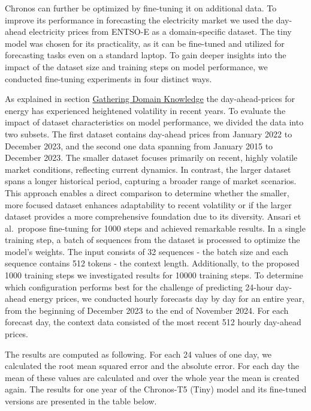\documentclass[a4paper]{article}
\begin{document}
    Chronos can further be optimized by fine-tuning it on additional data.
To improve its performance in forecasting the electricity market we used
the day-ahead electricity prices from ENTSO-E as a domain-specific
dataset. The tiny model was chosen for its practicality, as it can be
fine-tuned and utilized for forecasting tasks even on a standard laptop.
To gain deeper insights into the impact of the dataset size and training
steps on model performance, we conducted fine-tuning experiments in four
distinct ways.

As explained in section
\hyperref[gathering-domain-knowledge]{Gathering Domain Knowledge} the
day-ahead-prices for energy has experienced heightened volatility in
recent years. To evaluate the impact of dataset characteristics on model
performance, we divided the data into two subsets. The first dataset
contains day-ahead prices from January 2022 to December 2023, and the
second one data spanning from January 2015 to December 2023. The smaller
dataset focuses primarily on recent, highly volatile market conditions,
reflecting current dynamics. In contrast, the larger dataset spans a
longer historical period, capturing a broader range of market scenarios.
This approach enables a direct comparison to determine whether the
smaller, more focused dataset enhances adaptability to recent volatility
or if the larger dataset provides a more comprehensive foundation due to
its diversity. Ansari et al.~propose fine-tuning for 1000 steps and
achieved remarkable results. In a single training step, a batch of
sequences from the dataset is processed to optimize the model's weights.
The input consists of 32 sequences - the batch size and each sequence
contains 512 tokens - the context length. Additionally, to the proposed
1000 training steps we investigated results for 10000 training steps. To
determine which configuration performs best for the challenge of
predicting 24-hour day-ahead energy prices, we conducted hourly
forecasts day by day for an entire year, from the beginning of December
2023 to the end of November 2024. For each forecast day, the context
data consisted of the most recent 512 hourly day-ahead prices.

    The results are computed as following. For each 24 values of one day, we
calculated the root mean squared error and the absolute error. For each
day the mean of these values are calculated and over the whole year the
mean is created again. The results for one year of the Chronos-T5 (Tiny)
model and its fine-tuned versions are presented in the table below.
\end{document}
